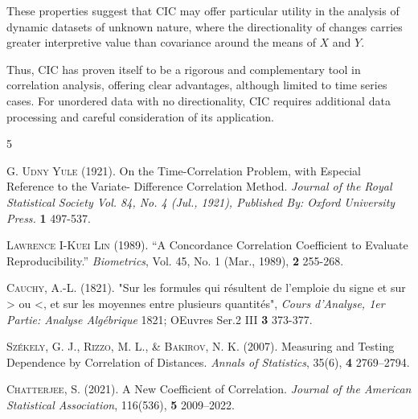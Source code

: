 \documentclass[aoas]{imsart}
\newcommand{\cic}{\text{CIC}}
\begin{document}
These properties suggest that $\cic$ may offer particular utility in the analysis of dynamic datasets of unknown nature, where the directionality of changes carries greater interpretive value than covariance around the means of $X$ and $Y$.

Thus, $\cic$ has proven itself to be a rigorous and complementary tool in correlation analysis, offering clear advantages, although limited to time series cases. For unordered data with no directionality, $\cic$ requires additional data processing and careful consideration of its application.


\begin{thebibliography}{5}


\textsc{G. Udny Yule} (1921).
On the Time-Correlation Problem, with Especial Reference to the Variate- Difference Correlation Method.
\textit{Journal of the Royal Statistical Society Vol. 84, No. 4 (Jul., 1921), Published By: Oxford University Press.}
\textbf{1} 497-537.


\textsc{Lawrence I-Kuei Lin} (1989). “A Concordance Correlation Coefficient to Evaluate Reproducibility.” \textit{Biometrics}, Vol. 45, No. 1 (Mar., 1989),
\textbf{2} 255-268.

\textsc{Cauchy, A.-L.} (1821). "Sur les formules qui résultent de l'emploie du signe et sur > ou <, et sur les moyennes entre plusieurs quantités", \textit{Cours d'Analyse, 1er Partie: Analyse Algébrique} 1821; OEuvres Ser.2 III
\textbf{3} 373-377.

\textsc{Székely, G. J., Rizzo, M. L., \& Bakirov, N. K.} (2007). Measuring and Testing Dependence by Correlation of Distances. \textit{Annals of Statistics}, 35(6),
\textbf{4} 2769–2794.

\textsc{Chatterjee, S.} (2021). A New Coefficient of Correlation. \textit{Journal of the American Statistical Association}, 116(536),
\textbf{5} 2009–2022.
\end{thebibliography}
\end{document}
